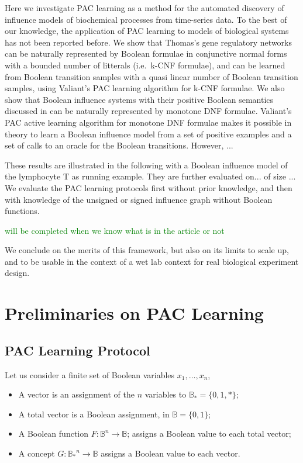 \documentclass{llncs}
\newcommand{\sylvain}[1]{\textcolor{green}{#1}}
\begin{document}
Here we investigate PAC learning as a method for the automated discovery of influence models of biochemical processes from time-series data. 
To the best of our knowledge, 
the application of PAC learning to models of biological systems has not been reported before.
We show that Thomas's gene regulatory networks \cite{Thomas91jtb,Thomas73jtb} can be naturally represented by 
Boolean formulae in conjunctive normal forms with a bounded number of litterals (i.e.~k-CNF formulae),
and can be learned from Boolean transition samples with a quasi linear number of Boolean transition samples, using Valiant's PAC learning algorithm for k-CNF formulae.
We also show that Boolean influence systems with their positive Boolean semantics discussed in \cite{FMRS16cmsb}
can be naturally represented by monotone DNF formulae.
Valiant's PAC active learning algorithm for monotone DNF formulae makes it possible in theory 
to learn a Boolean influence model from a set of positive examples and a set of calls to an oracle for the Boolean transitions.
However, ...

These results are illustrated in the following with a Boolean influence model of the lymphocyte T as running example.
They are further evaluated on... of size ...
We evaluate the PAC learning protocols first without prior knowledge, and then with knowledge of the unsigned or signed influence graph without Boolean functions.

\sylvain{will be completed when we know what is in the article or not}

We conclude on the merits of this framework, but also on its limits to scale up,
and to be usable in the context of a wet lab context for real biological experiment design.


\section{Preliminaries on PAC Learning}\label{pac}

\subsection{PAC Learning Protocol}


Let us consider a finite set of Boolean variables $x_1,\ldots,x_n$,
\begin{itemize}
	\item A vector is an assignment of the $n$ variables to $\mathbb{B}_* = \{0,1,*\}$;
	\item A total vector is a Boolean assignment, in $\mathbb{B} = \{0,1\}$;
	\item A Boolean function $F:{\mathbb{B}}^n \rightarrow \mathbb{B}$;
	assigns a Boolean value to each total vector;
\item A concept $G:{\mathbb{B}_*}^n \rightarrow \mathbb{B}$
	assigns a Boolean value to each vector.
\end{itemize}
\end{document}
